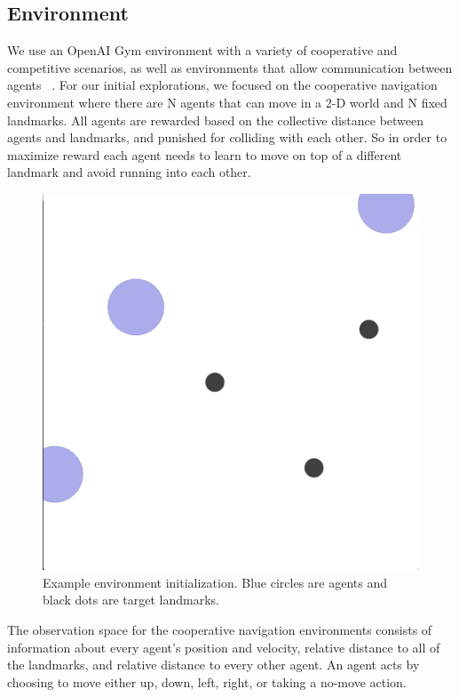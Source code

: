 \documentclass{article}
\begin{document}
\subsection{Environment}

We use an OpenAI Gym environment with a variety of cooperative and competitive scenarios, as well as environments that allow communication between agents ~\cite{openaigym}. For our initial explorations, we focused on the cooperative navigation environment where there are N agents that can move in a 2-D world and N fixed landmarks. All agents are rewarded based on the collective distance between agents and landmarks, and punished for colliding with each other. So in order to maximize reward each agent needs to learn to move on top of a different landmark and avoid running into each other.

\begin{figure}
\begin{center}
\includegraphics[scale=0.15]{env-image}
\end{center}
\caption{Example environment initialization. Blue circles are agents and black dots are target landmarks.}
\end{figure}

The observation space for the cooperative navigation environments consists of information about every agent's position and velocity, relative distance to all of the landmarks, and relative distance to every other agent. An agent acts by choosing to move either up, down, left, right, or taking a no-move action. 
\end{document}
